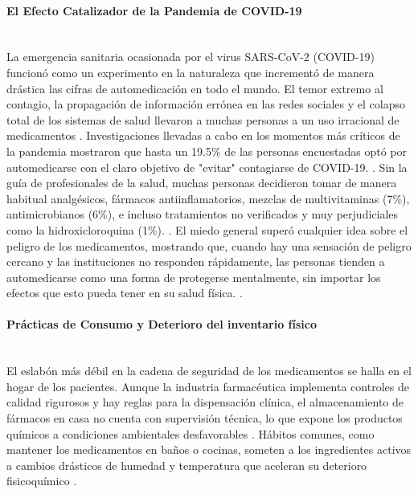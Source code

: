 \paragraph{El Efecto Catalizador de la Pandemia de COVID-19}\leavevmode \\

La emergencia sanitaria ocasionada por el virus SARS-CoV-2 (COVID-19) funcionó como un experimento en la naturaleza que incrementó de manera drástica las cifras de automedicación en todo el mundo. El temor extremo al contagio, la propagación de información errónea en las redes sociales y el colapso total de los sistemas de salud llevaron a muchas personas a un uso irracional de medicamentos \cite{ramos2025automedicacion}.
Investigaciones llevadas a cabo en los momentos más críticos de la pandemia mostraron que hasta un 19.5\% de las personas encuestadas optó por automedicarse con el claro objetivo de "evitar" contagiarse de COVID-19. \cite{ramos2025automedicacion}. Sin la guía de profesionales de la salud, muchas personas decidieron tomar de manera habitual analgésicos, fármacos antiinflamatorios, mezclas de multivitaminas (7\%), antimicrobianos (6\%), e incluso tratamientos no verificados y muy perjudiciales como la hidroxicloroquina (1\%). \cite{ramos2025automedicacion}. El miedo general superó cualquier idea sobre el peligro de los medicamentos, mostrando que, cuando hay una sensación de peligro cercano y las instituciones no responden rápidamente, las personas tienden a automedicarse como una forma de protegerse mentalmente, sin importar los efectos que esto pueda tener en su salud física. \cite{ramos2025automedicacion}.

\paragraph{Prácticas de Consumo y Deterioro del inventario físico} \leavevmode \\

El eslabón más débil en la cadena de seguridad de los medicamentos se halla en el hogar de los pacientes. Aunque la industria farmacéutica implementa controles de calidad rigurosos y hay reglas para la dispensación clínica, el almacenamiento de fármacos en casa no cuenta con supervisión técnica, lo que expone los productos químicos a condiciones ambientales desfavorables \cite{almacenamiento_hogar_2022}. Hábitos comunes, como mantener los medicamentos en baños o cocinas, someten a los ingredientes activos a cambios drásticos de humedad y temperatura que aceleran su deterioro fisicoquímico \cite{almacenamiento_hogar_2022}.

